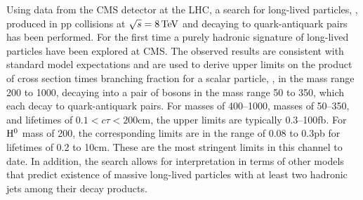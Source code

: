 Using data from the CMS detector at the LHC,
a search for long-lived particles, \X, produced in pp collisions at $\sqrt{s} = 8\,\text{Te\hspace{-.08em}V}$ and decaying
to quark-antiquark pairs has been performed. For the first time a purely hadronic signature
of long-lived particles have been explored at CMS.
The observed results are consistent with standard model expectations and are used to derive upper
limits on the product of cross section times branching fraction for a scalar particle,
 \Higgs, in the mass range 200 to 1000\GeV, decaying into a pair of \X bosons in the mass
range 50 to 350\GeV, which each decay to quark-antiquark pairs. For \Higgs masses of 400--1000\GeV, \X
masses of 50--350\GeV, and \X lifetimes of $0.1<c\tau<200$\:cm, the upper limits are typically 0.3--100\:fb.
 For $\mathrm{H}^{0}$ mass of 200\GeV, the corresponding limits are in the range of 0.08 to 0.3\:pb for \X
lifetimes of 0.2 to 10\:cm. These are the most stringent limits in this channel to date.
In addition, the search allows for interpretation in terms of other models that predict 
existence of massive long-lived particles with at least two hadronic
jets among their decay products.
